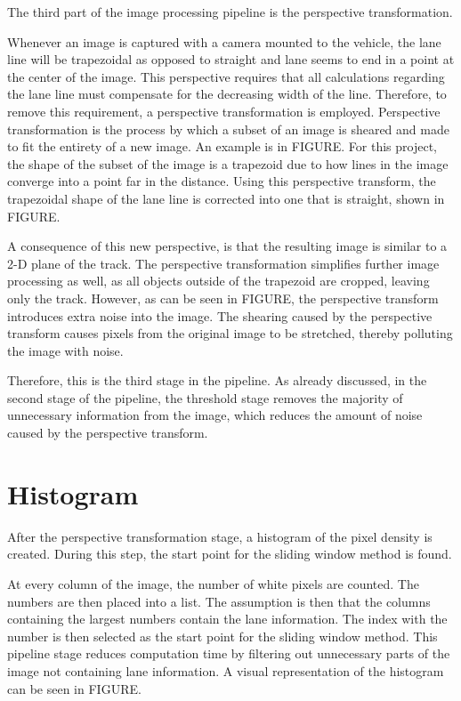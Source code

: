 \documentclass[arbeit=studie,oneside,BCOR=12mm]{ArbeitRST}
\begin{document}
The third part of the image processing pipeline is the perspective 
transformation. 

Whenever an image is captured with a camera mounted to the vehicle, the lane
line will be trapezoidal as opposed to straight and lane seems to end in a
point at the center of the image. This perspective requires that all
calculations regarding the lane line must compensate for the decreasing width
of the line. Therefore, to remove this requirement, a perspective
transformation is employed. Perspective transformation is the process by which
a subset of an image is sheared and made to fit the entirety of a new image. An
example is in FIGURE. For this project, the shape of the subset of the image is
a trapezoid due to how lines in the image converge into a point far in the
distance. Using this perspective transform, the trapezoidal shape of the lane
line is corrected into one that is straight, shown in FIGURE.

A consequence of this new perspective, is that the resulting image is similar
to a 2-D plane of the track. The perspective transformation simplifies further
image processing as well, as all objects outside of the trapezoid are cropped,
leaving only the track. However, as can be seen in FIGURE, the perspective
transform introduces extra noise into the image. The shearing caused by the
perspective transform causes pixels from the original image to be stretched,
thereby polluting the image with noise. 

Therefore, this is the third stage in the pipeline. As already discussed, in 
the second stage of the pipeline, the threshold stage removes the majority of 
unnecessary information from the image, which reduces the amount of noise 
caused by the perspective transform.

\section{Histogram}

After the perspective transformation stage, a histogram of the pixel density 
is created. During this step, the start point for the sliding window method is
found. 

At every column of the image, the number of white pixels are counted. 
The numbers are then placed into a list. The assumption is then that the 
columns containing the largest numbers contain the lane information. The 
index with the number is then selected as the start point for the sliding 
window method. This pipeline stage reduces computation time by filtering out 
unnecessary parts of the image not containing lane information. A visual 
representation of the histogram can be seen in FIGURE.
\end{document}
